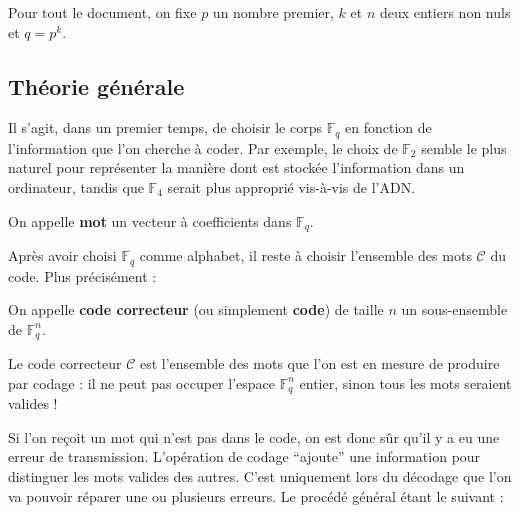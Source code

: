 





  \nocite{[FFN]}
  \nocite{[PEY]}
  \nocite{[BMP]}

  Pour tout le document, on fixe $p$ un nombre premier, $k$ et $n$ deux entiers non nuls et $q = p^k$.

  \subsection{Théorie générale}

  Il s'agit, dans un premier temps, de choisir le corps $\mathbb{F}_q$ en fonction de l'information que l'on cherche à coder. Par exemple, le choix de $\mathbb{F}_2$ semble le plus naturel pour représenter la manière dont est stockée l'information dans un ordinateur, tandis que $\mathbb{F}_4$ serait plus approprié vis-à-vis de l'ADN.

  \begin{definition}
    On appelle \textbf{mot} un vecteur à coefficients dans $\mathbb{F}_q$.
  \end{definition}

  Après avoir choisi $\mathbb{F}_q$ comme alphabet, il reste à choisir l'ensemble des mots $\mathcal{C}$ du code. Plus précisément :

  \begin{definition}
    On appelle \textbf{code correcteur} (ou simplement \textbf{code}) de taille $n$ un sous-ensemble de $\mathbb{F}_q^n$.
  \end{definition}

  \begin{remark}
    Le code correcteur $\mathcal{C}$ est l'ensemble des mots que l'on est en mesure de produire par codage : il ne peut pas occuper l'espace $\mathbb{F}_q^n$ entier, sinon tous les mots seraient valides !
  \end{remark}

  Si l'on reçoit un mot qui n'est pas dans le code, on est donc sûr qu'il y a eu une erreur de transmission. L'opération de codage ``ajoute'' une information pour distinguer les mots valides des autres. C'est uniquement lors du décodage que l'on va pouvoir réparer une ou plusieurs erreurs. Le procédé général étant le suivant :
  
